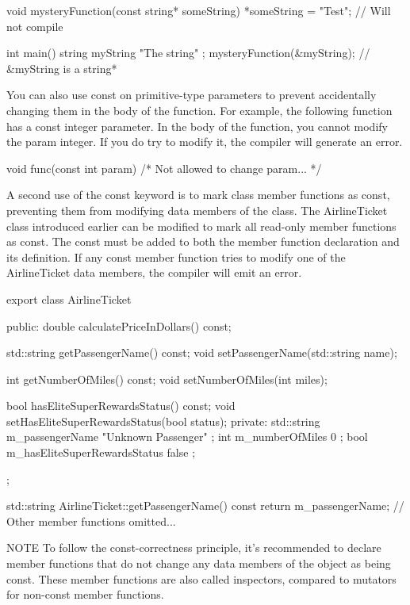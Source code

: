 \begin{cpp}
void mysteryFunction(const string* someString)
{
    *someString = "Test"; // Will not compile
}

int main()
{
    string myString { "The string" };
    mysteryFunction(&myString); // &myString is a string*
}
\end{cpp}

You can also use const on primitive-type parameters to prevent accidentally changing them in the body of the function. For example, the following function has a const integer parameter. In the body of the function, you cannot modify the param integer. If you do try to modify it, the compiler will generate an error.

\begin{cpp}
void func(const int param) { /* Not allowed to change param... */ }
\end{cpp}


A second use of the const keyword is to mark class member functions as const, preventing them from modifying data members of the class. The AirlineTicket class introduced earlier can be modified to mark all read-only member functions as const. The const must be added to both the member function declaration and its definition. If any const member function tries to modify one of the AirlineTicket data members, the compiler will emit an error.

\begin{cpp}
export class AirlineTicket
{
    public:
        double calculatePriceInDollars() const;

        std::string getPassengerName() const;
        void setPassengerName(std::string name);

        int getNumberOfMiles() const;
        void setNumberOfMiles(int miles);

        bool hasEliteSuperRewardsStatus() const;
        void setHasEliteSuperRewardsStatus(bool status);
    private:
        std::string m_passengerName { "Unknown Passenger" };
        int m_numberOfMiles { 0 };
        bool m_hasEliteSuperRewardsStatus { false };
};

std::string AirlineTicket::getPassengerName() const
{
    return m_passengerName;
}
// Other member functions omitted...
\end{cpp}

\begin{myNotic}{NOTE}
To follow the const-correctness principle, it’s recommended to declare member functions that do not change any data members of the object as being const. These member functions are also called inspectors, compared to mutators for non-const member functions.
\end{myNotic}

